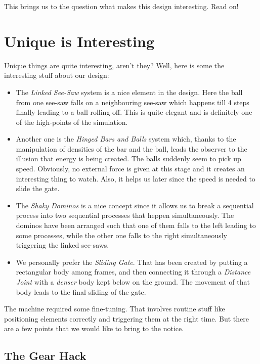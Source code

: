 \documentclass[a4paper,11pt]{article}
\begin{document}
This brings us to the question what makes this design interesting. Read on!

\section{Unique is Interesting}

Unique things are quite interesting, aren't they? Well, here is some the interesting stuff about our design:

\begin {itemize}
\item The \emph{Linked See-Saw} system is a nice element in the design. Here the ball from one see-saw falls on a neighbouring see-saw which happens till 4 steps finally leading to a ball rolling off. This is quite elegant and is definitely one of the high-points of the simulation.
\item Another one is the \emph{Hinged Bars and Balls} system which, thanks to the manipulation of densities of the bar and the ball, leads the observer to the illusion that energy is being created. The balls suddenly seem to pick up speed. Obviously, no external force is given at this stage and it creates an interesting thing to watch. Also, it helps us later since the speed is needed to slide the gate.
\item The \emph{Shaky Dominos} is a nice concept since it allows us to break a sequential process into two sequential processes that heppen simultaneously. The dominos have been arranged such that one of them falls to the left leading to some processes, while the other one falls to the right simultaneously triggering the linked see-saws.
\item We personally prefer the \emph{Sliding Gate}. That has been created by putting a rectangular body among frames, and then connecting it through a \emph{Distance Joint} with a \emph{denser} body kept below on the ground. The movement of that body leads to the final sliding of the gate.
\end{itemize}

The machine required some fine-tuning. That involves routine stuff like positioning elements correctly and triggering them at the right time. But there are a few points that we would like to bring to the notice.

\subsection{The Gear Hack}
\end{document}
